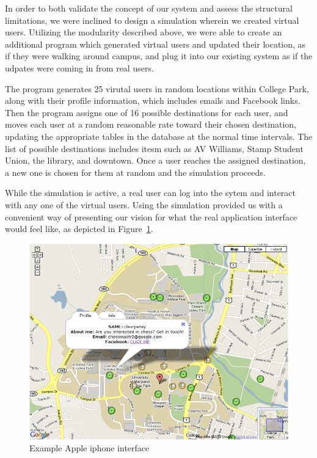\documentclass[11pt]{article}
\begin{document}
In order to both validate the concept of our system and assess the structural limitations, we were inclined to design a simulation wherein we created virtual users. Utilizing the modularity described above, we were able to create an additional program which generated virtual users and updated their location, as if they were walking around campus, and plug it into our existing system as if the udpates were coming in from real users. 

The program generates 25 virutal users in random locations within College Park, along with their profile information, which includes emails and Facebook links. Then the program assigns one of 16 possible destinations for each user, and moves each user at a random reasonable rate toward their chosen destination, updating the appropriate tables in the database at the normal time intervals. The list of possible destinations includes itesm such as AV Williams, Stamp Student Union, the library, and downtown. Once a user reaches the assigned destination, a new one is chosen for them at random and the simulation proceeds. 

While the simulation is active, a real user can log into the sytem and interact with any one of the virtual users. Using the simulation provided us with a convenient way of presenting our vision for what the real application interface would feel like, as depicted in Figure~\ref{fig:sim1}. 


\begin{figure}[h]
\begin{center}
  \includegraphics[scale=0.5]{sim1.png}
\caption{Example Apple iphone interface}
\label{fig:sim1} 
\end{center}
\end{figure}
\end{document}
